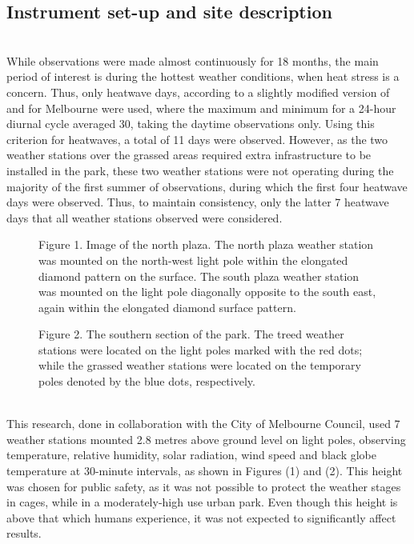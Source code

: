 \documentclass[twocolumn, a4paper]{article}
\begin{document}
\subsection{Instrument set-up and site description}
\\
While observations were made almost continuously for 18 months, the main period of interest is during the hottest weather conditions, when heat stress is a concern. Thus, only heatwave days, according to a slightly modified version of \cite{RN577} and \cite{RN2041} for Melbourne were used, where the maximum and minimum for a 24-hour diurnal cycle averaged 30\celsius, taking the daytime observations only. Using this criterion for heatwaves, a total of 11 days were observed. However, as the two weather stations over the grassed areas required extra infrastructure to be installed in the park, these two weather stations were not operating during the majority of the first summer of observations, during which the first four heatwave days were observed. Thus, to maintain consistency, only the latter 7 heatwave days that all weather stations observed were considered.
\begin{figure}
	\begin{center}
		\caption{Figure 1. Image of the north plaza. The north plaza weather station was mounted on the north-west light pole within the elongated diamond pattern on the surface. The south plaza weather station was mounted on the light pole diagonally opposite to the south east, again within the elongated diamond surface pattern. \label{fig:prior_uncertainties}}
	\end{center}
\end{figure}

\begin{figure}
	\begin{center}
		\caption{Figure 2. The southern section of the park. The treed weather stations were located on the light poles marked with the red dots; while the grassed weather stations were located on the temporary poles denoted by the blue dots, respectively. \label{fig:prior_uncertainties}}
	\end{center}
\end{figure}


\\
This research, done in collaboration with the City of Melbourne Council, used 7 weather stations mounted 2.8 metres above ground level on light poles, observing temperature, relative humidity, solar radiation, wind speed and black globe temperature at 30-minute intervals, as shown in Figures (1) and (2). This height was chosen for public safety, as it was not possible to protect the weather stages in cages, while in a moderately-high use urban park. Even though this height is above that which humans experience, it was not expected to significantly affect results.
\\
\end{document}
